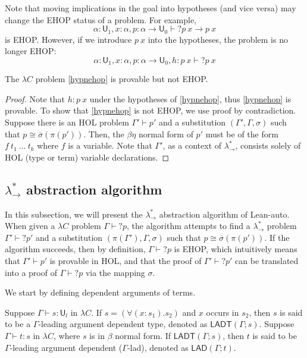 Note that moving implications in the goal into hypotheses (and vice versa) may
change the EHOP status of a problem. For example,
$$\alpha : \mathsf{U}_1, x : \alpha, p : \alpha \to \mathsf{U}_0 \vdash? p \ x \to p \ x$$
is EHOP. However, if we introduce $p \ x$ into the hypotheses, the problem is no longer EHOP:
\begin{equation}\label{hypnehop}
  \alpha : \mathsf{U}_1, x : \alpha, p : \alpha \to \mathsf{U}_0, h : p \ x \vdash? p \ x
\end{equation}

\begin{theorem}
  The $\lambda C$ problem \eqref{hypnehop} is provable but not EHOP.
\end{theorem}
\begin{proof}
  Note that $h : p \ x$ under the hypotheses of \eqref{hypnehop}, thus \eqref{hypnehop} is provable.
  To show that \eqref{hypnehop} is not EHOP, we use proof by contradiction. Suppose there
  is an HOL problem $\Gamma' \vdash p'$ and a substitution $(\Gamma', \Gamma, \sigma)$ such
  that $p \cong \overline{\sigma}(\pi(p'))$. Then, the $\beta\eta$ normal form of $p'$ must be of the form
  $f \ t_1 \ \dots \ t_k$ where $f$ is a variable. Note that $\Gamma'$, as a context of $\lambda_\to^*$,
  consists solely of HOL (type or term) variable declarations.
\end{proof}

\subsection{$\lambda_\to^*$ abstraction algorithm}

In this subsection, we will present the $\lambda_\to^*$ abstraction algorithm of Lean-auto. When given a
$\lambda C$ problem $\Gamma \vdash? p$, the algorithm attempts to find a $\lambda_\to^*$
problem $\Gamma' \vdash? p'$ and a substitution $(\pi(\Gamma'), \Gamma, \sigma)$ such that
$p \cong \overline{\sigma}(\pi(p'))$. If the algorithm succeeds, then by definition, $\Gamma \vdash? p$
is EHOP, which intuitively means that $\Gamma' \vdash p'$ is provable in HOL, and that the
proof of $\Gamma' \vdash? p'$ can be translated into a proof of $\Gamma \vdash? p$ via
the mapping $\sigma$.

We start by defining dependent arguments of terms.

\begin{definition} Suppose $\Gamma \vdash s : \mathsf{U}_l$ in $\lambda C$.
  If $s = (\forall (x : s_1). s_2)$ and $x$ occurs in $s_2$,
  then $s$ is said to be a $\Gamma$-leading argument dependent type,
  denoted as $\mathsf{LADT}(\Gamma; s)$. Suppose $\Gamma \vdash t : s$ in $\lambda C$, where $s$
  is in $\beta$ normal form. If $\mathsf{LADT}(\Gamma; s)$, then $t$ is said to be
  $\Gamma$-leading argument dependent ($\Gamma$-lad), denoted as $\mathsf{LAD}(\Gamma; t)$.
\end{definition}

